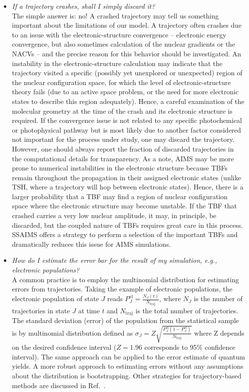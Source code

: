 \documentclass[9pt,bestpractices]{livecoms}
\begin{document}
\begin{itemize}
\item{\textit{If a trajectory crashes, shall I simply discard it?} \\
The simple answer is: no! A crashed trajectory may tell us something important about the limitations of our model. A trajectory often crashes due to an issue with the electronic-structure convergence -- electronic energy convergence, but also sometimes calculation of the nuclear gradients or the NACVs -- and the precise reason for this behavior should be investigated. An instability in the electronic-structure calculation may indicate that the trajectory visited a specific (possibly yet unexplored or unexpected) region of the nuclear configuration space, for which the level of electronic-structure theory fails (due to an active space problem, or the need for more electronic states to describe this region adequately). Hence, a careful examination of the molecular geometry at the time of the crash and its electronic structure is required. If the convergence issue is not related to any specific photochemical or photophysical pathway but is most likely due to another factor considered not important for the process under study, one may discard the trajectory. However, one should always report the fraction of discarded trajectories in the computational details for transparency. As a note, AIMS may be more prone to numerical instabilities in the electronic structure because TBFs remain throughout the propagation in their assigned electronic states (unlike TSH, where a trajectory will hop between electronic states). Hence, there is a larger probability that a TBF may find a region of nuclear configuration space where the electronic structure may become unstable. If the TBF that crashed carries a very low nuclear amplitude, it may, in principle, be discarded, but the coupled nature of TBFs requires great care in this process. SSAIMS offers a strategy to perform a selection of the important TBFs and dramatically reduces this issue for AIMS simulations.\cite{curchod2020ssaims,ibele2021ssaims}
}

\item{\textit{How do I estimate the error bar for the result of my simulation, e.g., electronic populations?} \\
A common practice is to employ the multinomial distribution for estimating errors from trajectories. Taking the example of electronic populations, the electronic population of state $J$ reads $P^\mathrm{el}_J = \frac{N_J(t)}{N_\mathrm{traj}}$, where $N_J$ is the number of trajectories in state $J$ at time $t$ and $N_\mathrm{traj}$ is the total number of trajectories. The standard deviation (error) of the population from the statistical sample is by multinomial distribution defined as $\sigma_J = Z\sqrt{\frac{P^\mathrm{el}_J (1-P^\mathrm{el}_J)}{N_\mathrm{traj}}}$ where Z depends on the desired confidence interval ($Z=1.96$ corresponds to 95\% confidence interval). The same approach can be applied to the error estimate of quantum yields. A more robust approach to estimating errors without any assumptions about the distribution is bootstrapping. Other strategies for trajectory-based methods are discussed in Ref.~.  

}
\end{itemize}
\end{document}
